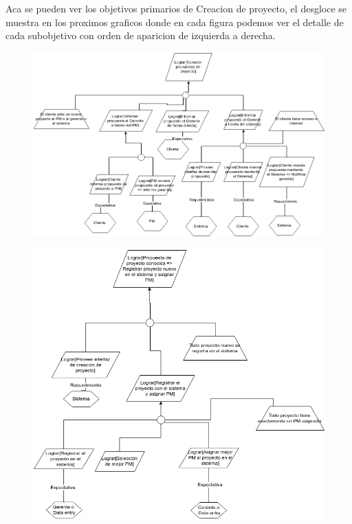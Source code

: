 Aca se pueden ver los objetivos primarios de Creacion de proyecto, el desgloce se muestra en los proximos graficos donde en cada figura podemos ver el detalle de cada subobjetivo con orden de aparicion de izquierda a derecha.

\vspace{1em}

\begin{figure}[H]
    \centering
    \includegraphics[width=\textwidth]{imagenes/objetivos-creacion-1.png}
\end{figure}

\vspace{1em}

\begin{figure}[H]
    \centering
    \includegraphics[width=\textwidth]{imagenes/objetivos-creacion-2.png}
\end{figure}

